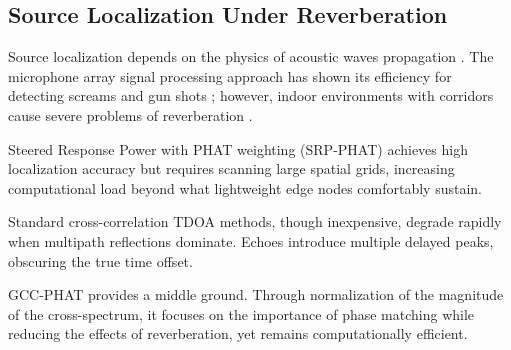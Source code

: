 \documentclass[conference]{IEEEtran}
\begin{document}
\begin{table}[htbp]
\caption{Applicability Analysis: Benchmark AED vs. Proposed System}
\begin{center}
\end{center}
\label{tab:comparison}
\end{table}

\subsection{Source Localization Under Reverberation}
Source localization depends on the physics of acoustic waves propagation \cite{b9}. The microphone array signal processing approach has shown its efficiency for detecting screams and gun shots \cite{b5, b29}; however, indoor environments with corridors cause severe problems of reverberation \cite{b25}.

Steered Response Power with PHAT weighting (SRP-PHAT) \cite{b27} achieves high localization accuracy but requires scanning large spatial grids, increasing computational load beyond what lightweight edge nodes comfortably sustain.

Standard cross-correlation TDOA methods, though inexpensive, degrade rapidly when multipath reflections dominate. Echoes introduce multiple delayed peaks, obscuring the true time offset.

\cite{b20} GCC-PHAT provides a middle ground. Through normalization of the magnitude of the cross-spectrum, it focuses on the importance of phase matching while reducing the effects of reverberation, yet remains computationally efficient.

\end{document}
